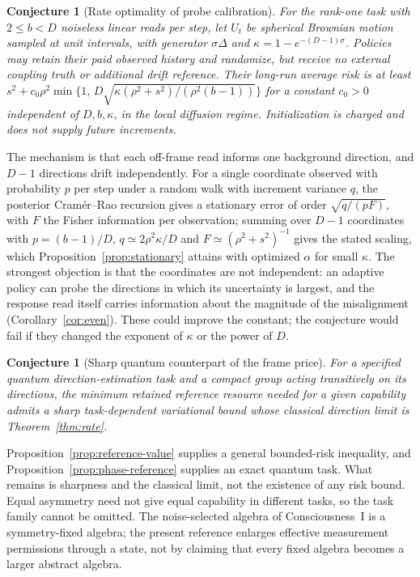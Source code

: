\documentclass[12pt]{article}
\newtheorem{conjecture}[theorem]{Conjecture}
\theoremstyle{definition}
\begin{document}
\begin{conjecture}[Rate optimality of probe calibration]
\label{conj:rate}
For the rank-one task with $2\le b<D$ noiseless linear reads per step,
let $U_t$ be spherical Brownian motion sampled at unit intervals, with
generator $\sigma\Delta$ and
$\kappa=1-e^{-(D-1)\sigma}$. Policies may retain their paid observed
history and randomize, but receive no external coupling truth or
additional drift reference. Their long-run average risk is at least
$s^2+c_0\rho^2\min\{1,\,
D\sqrt{\kappa(\rho^2+s^2)/(\rho^2(b-1))}\}$
for a constant $c_0>0$ independent of $D,b,\kappa$, in the local
diffusion regime. Initialization is charged and does not supply future
increments.
\end{conjecture}

The mechanism is that each off-frame read informs one background direction, and $D-1$ directions drift independently. For a single coordinate observed with probability $p$ per step under a random walk with increment variance $q$, the posterior Cram\'er--Rao recursion gives a stationary error of order $\sqrt{q/(pF)}$, with $F$ the Fisher information per observation; summing over $D-1$ coordinates with $p=(b-1)/D$, $q\simeq2\rho^2\kappa/D$ and $F\simeq(\rho^2+s^2)^{-1}$ gives the stated scaling, which Proposition~\ref{prop:stationary} attains with optimized $\alpha$ for small $\kappa$. The strongest objection is that the coordinates are not independent: an adaptive policy can probe the directions in which its uncertainty is largest, and the response read itself carries information about the magnitude of the misalignment (Corollary~\ref{cor:even}). These could improve the constant; the conjecture would fail if they changed the exponent of $\kappa$ or the power of $D$.

\begin{conjecture}[Sharp quantum counterpart of the frame price]
\label{conj:algebra}
For a specified quantum direction-estimation task and a compact group acting
transitively on its directions, the minimum retained reference resource
needed for a given capability admits a sharp task-dependent variational
bound whose classical direction limit is Theorem~\ref{thm:rate}.
\end{conjecture}

Proposition~\ref{prop:reference-value} supplies a general bounded-risk inequality,
and Proposition~\ref{prop:phase-reference} supplies an exact quantum task.
What remains is sharpness and the classical limit, not the existence of
any risk bound. Equal asymmetry need not give equal capability in different
tasks, so the task family cannot be omitted. The noise-selected algebra of
Consciousness~I is a symmetry-fixed algebra; the present reference enlarges
effective measurement permissions through a state, not by claiming that
every fixed algebra becomes a larger abstract algebra.
\end{document}
